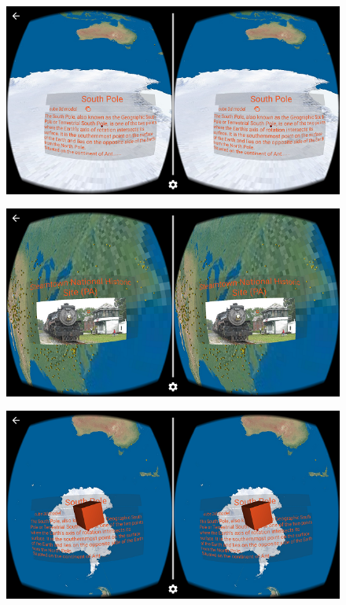 \begin{figure}[H]
	\centering
	\includegraphics[width=\linewidth, keepaspectratio]{Figures/Screenshots/placemark-text.png}
	\decoRule
\end{figure}

\begin{figure}[H]
	\centering
	\includegraphics[width=\linewidth, keepaspectratio]{Figures/Screenshots/placemark-image.png}
	\decoRule
\end{figure}

\begin{figure}[H]
	\centering
	\includegraphics[width=\linewidth, keepaspectratio]{Figures/Screenshots/placemark-obj-1.png}
	\decoRule
\end{figure}

